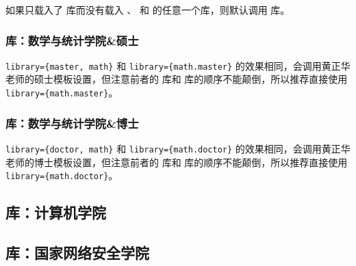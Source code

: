 如果只载入了  库而没有载入 、 和  的任意一个库，则默认调用  库。


\subsubsection{ 库：数学与统计学院\&硕士}


\verb|library={master, math}| 和 \verb|library={math.master}| 的效果相同，会调用黄正华老师的硕士模板设置，但注意前者的  库和  库的顺序不能颠倒，所以推荐直接使用 \verb|library={math.master}|。


\subsubsection{ 库：数学与统计学院\&博士}


\verb|library={doctor, math}| 和 \verb|library={math.doctor}| 的效果相同，会调用黄正华老师的博士模板设置，但注意前者的  库和  库的顺序不能颠倒，所以推荐直接使用 \verb|library={math.doctor}|。

\subsection{ 库：计算机学院}


\subsection{ 库：国家网络安全学院}